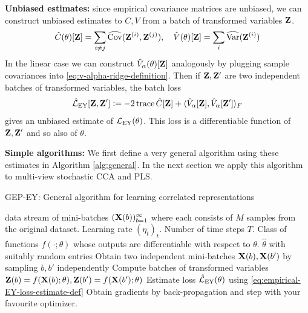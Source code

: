 \textbf{Unbiased estimates:}
since empirical covariance matrices are unbiased, we can construct unbiased estimates to $C, V$ from a batch of transformed variables $\mathbf{Z}$.
\begin{align}\label{eq:def-C-V-matrices-empirical}
\hat{C}(\theta)[\mathbf{Z}] = \sum_{i \neq j} \widehat{\mathrm{Cov}}(\mathbf{Z}^{(i)}, \mathbf{Z}^{(j)}), \quad
\hat{V}(\theta)[\mathbf{Z}] = \sum_{i} \widehat{\mathrm{Var}}(\mathbf{Z}^{(i)})
\end{align}
In the linear case we can construct $\hat{V}_\alpha(\theta)[\mathbf{Z}]$ analogously by plugging sample covariances into \cref{eq:v-alpha-ridge-definition}.
Then if $\mathbf{Z}, \mathbf{Z}'$ are two independent batches of transformed variables, the batch loss
\begin{align}\label{eq:empirical-EY-loss-estimate-def}
\hat{\mathcal{L}}_\text{EY}[\mathbf{Z}, \mathbf{Z}'] \vcentcolon= - 2 \operatorname{trace} \hat{C}[\mathbf{Z}] + \langle \hat{V}_\alpha[\mathbf{Z}], \hat{V}_\alpha[\mathbf{Z}'] \rangle_F
\end{align}
gives an unbiased estimate of $\mathcal{L}_\text{EY}(\theta)$.
This loss is a differentiable function of $\mathbf{Z}, \mathbf{Z}'$ and so also of $\theta$.

\textbf{Simple algorithms:}
We first define a very general algorithm using these estimates in Algorithm \ref{alg:general}.
In the next section we apply this algorithm to multi-view stochastic CCA and PLS.

\begin{algorithm}
    \caption{GEP-EY: General algorithm for learning correlated representations}
    \label{alg:general}
    \begin{algorithmic}
         data stream of mini-batches $(\mathbf{X}(b))_{b=1}^\infty$ where each consists of $M$ samples from the original dataset. Learning rate $(\eta_t)_t$. Number of time steps $T$. Class of functions $f(\cdot; \theta)$ whose outputs are differentiable with respect to $\theta$.
         $\hat{\theta}$ with suitably random entries
        \STATE Obtain two independent mini-batches \( \mathbf{X}(b), \mathbf{X}(b') \) by sampling \( b, b' \) independently
        \STATE Compute batches of transformed variables $\mathbf{Z}(b) = f(\mathbf{X}(b); \theta), \mathbf{Z}(b') = f(\mathbf{X}(b'); \theta)$
        \STATE Estimate loss $\hat{\mathcal{L}}_\text{EY}(\theta)$ using \cref{eq:empirical-EY-loss-estimate-def}
        \STATE Obtain gradients by back-propagation and step with your favourite optimizer.
        \ENDFOR
    \end{algorithmic}
\end{algorithm}

